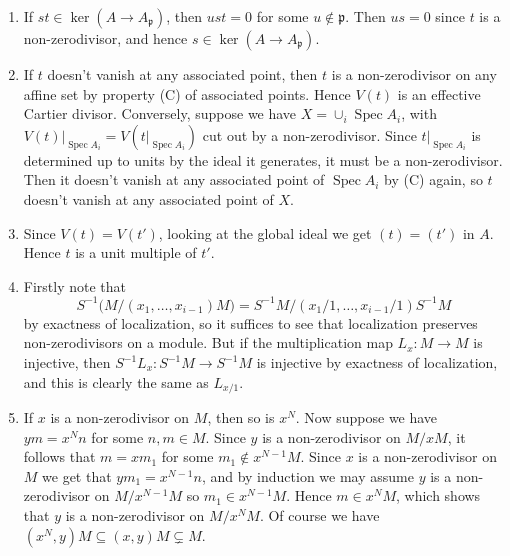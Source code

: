\documentclass{report}
\newcommand{\p}{\mathfrak{p}}
\DeclareMathOperator{\Spec}{Spec}
\begin{document}
\begin{enumerate}[label=\textbf{8.4.\Alph*.}]
	\item If $st\in\ker(A\to A_\p)$, then $ust=0$ for some $u\notin\p$. Then
	      $us=0$ since $t$ is a non-zerodivisor, and hence $s\in\ker(A\to A_\p)$.

	\item If $t$ doesn't vanish at any associated point, then $t$ is a
	      non-zerodivisor on any affine set by property (C) of associated points.
	      Hence $V(t)$ is an effective Cartier divisor. Conversely, suppose we
	      have $X=\cup_i\Spec A_i$, with $V(t)|_{\Spec A_i}=V(t|_{\Spec A_i})$ cut
	      out by a non-zerodivisor. Since $t|_{\Spec A_i}$ is determined up to
	      units by the ideal it generates, it must be a non-zerodivisor. Then it
	      doesn't vanish at any associated point of $\Spec A_i$ by (C) again, so
	      $t$ doesn't vanish at any associated point of $X$.

	\item Since $V(t)=V(t')$, looking at the global ideal we get $(t)=(t')$ in
	      $A$. Hence $t$ is a unit multiple of $t'$.

	\item Firstly note that
	      \begin{equation*}
		      S^{-1}\bigl(M/(x_1,\ldots,x_{i-1})M\bigr)
		      = S^{-1}M/(x_1/1,\ldots,x_{i-1}/1)S^{-1}M
	      \end{equation*}
	      by exactness of localization, so it suffices to see that localization
	      preserves non-zerodivisors on a module. But if the multiplication map
	      $L_x:M\to M$ is injective, then $S^{-1}L_x:S^{-1}M\to S^{-1}M$ is
	      injective by exactness of localization, and this is clearly the same as
	      $L_{x/1}$.

	\item If $x$ is a non-zerodivisor on $M$, then so is $x^N$. Now suppose we
	      have $ym=x^Nn$ for some $n,m\in M$. Since $y$ is a non-zerodivisor on
	      $M/xM$, it follows that $m=xm_1$ for some $m_1\notin x^{N-1}M$. Since
	      $x$ is a non-zerodivisor on $M$ we get that $ym_1=x^{N-1}n$, and by
	      induction we may assume $y$ is a non-zerodivisor on $M/x^{N-1}M$ so
	      $m_1\in x^{N-1}M$. Hence $m\in x^NM$, which shows that $y$ is a
	      non-zerodivisor on $M/x^NM$. Of course we have
	      $(x^N,y)M\subseteq(x,y)M\subsetneq M$.
\end{enumerate}
\end{document}
